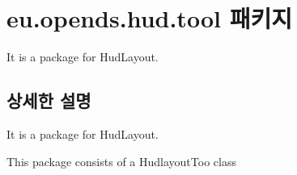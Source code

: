 \hypertarget{namespaceeu_1_1opends_1_1hud_1_1tool}{}\section{eu.\+opends.\+hud.\+tool 패키지}
\label{namespaceeu_1_1opends_1_1hud_1_1tool}


It is a package for Hud\+Layout.  




\subsection{상세한 설명}
It is a package for Hud\+Layout. 

This package consists of a Hudlayout\+Too class 